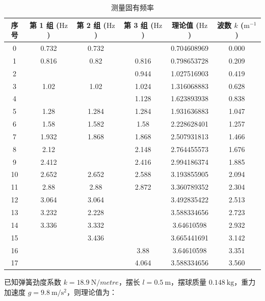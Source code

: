\documentclass{customDoc}
\begin{document}
\begin{table}[htbp]
  \centering
  \caption{测量固有频率}
    \begin{tabular}{|c|c|c|c|c|c|}
    \hline
    序号    & 第 1 组 ($\si{\hertz}$) & 第 2 组 ($\si{\hertz}$) & 第 3 组 ($\si{\hertz}$) & 理论值 ($\si{\hertz}$) & 波数 $k$ ($\si{\metre}^{-1}$) \\
    \hline
    0     & 0.732 & 0.732 &       & 0.704608969 & 0.000 \\
    \hline
    1     & 0.816 & 0.82  & 0.816 & 0.798653728 & 0.209 \\
    \hline
    2     &       &       & 0.944 & 1.027516903 & 0.419 \\
    \hline
    3     & 1.02  & 1.02  & 1.024 & 1.316068883 & 0.628 \\
    \hline
    4     &       &       & 1.128 & 1.623893938 & 0.838 \\
    \hline
    5     & 1.28  & 1.284 & 1.284 & 1.931636883 & 1.047 \\
    \hline
    6     & 1.58  & 1.582 & 1.58  & 2.228628401 & 1.257 \\
    \hline
    7     & 1.932 & 1.868 & 1.868 & 2.507931813 & 1.466 \\
    \hline
    8     & 2.12  &       & 2.148 & 2.764455573 & 1.676 \\
    \hline
    9     & 2.412 &       & 2.416 & 2.994186374 & 1.885 \\
    \hline
    10    & 2.652 & 2.652 & 2.588 & 3.193855905 & 2.094 \\
    \hline
    11    & 2.88  & 2.88  & 2.872 & 3.360789352 & 2.304 \\
    \hline
    12    & 3.064 & 3.064 &       & 3.492835422 & 2.513 \\
    \hline
    13    & 3.232 & 2.228 &       & 3.588334656 & 2.723 \\
    \hline
    14    & 3.336 & 3.332 &       & 3.64610598 & 2.932 \\
    \hline
    15    &       & 3.436 &       & 3.665441691 & 3.142 \\
    \hline
    16    &       &       & 3.88  & 3.64610598 & 3.351 \\
    \hline
    17    &       &       & 4.064 & 3.588334656 & 3.560 \\
    \hline
    \end{tabular}
  \label{tab:addlabel}
\end{table}

已知弹簧劲度系数 $k = \SI{18.9}{\newton/metre}$，摆长 $l = \SI{0.5}{\metre}$，摆球质量 $\SI{0.148}{\kilo\gram}$，重力加速度 $g = \SI{9.8}{\metre\per\second\squared}$，则理论值为：
\end{document}
